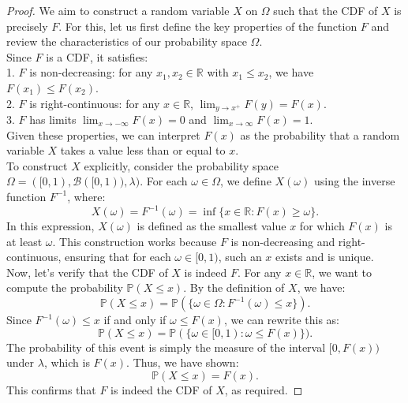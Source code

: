 \begin{proof}
We aim to construct a random variable \( X \) on \( \Omega \) such that the CDF of \( X \) is precisely \( F \). For this, let us first define the key properties of the function \( F \) and review the characteristics of our probability space \( \Omega \).\\

Since \( F \) is a CDF, it satisfies:\\

1. \( F \) is non-decreasing: for any \( x_1, x_2 \in \mathbb{R} \) with \( x_1 \leq x_2 \), we have \( F(x_1) \leq F(x_2) \).\\
2. \( F \) is right-continuous: for any \( x \in \mathbb{R} \), \( \lim_{y \to x^+} F(y) = F(x) \).\\
3. \( F \) has limits \( \lim_{x \to -\infty} F(x) = 0 \) and \( \lim_{x \to \infty} F(x) = 1 \).\\

Given these properties, we can interpret \( F(x) \) as the probability that a random variable \( X \) takes a value less than or equal to \( x \).\\

To construct \( X \) explicitly, consider the probability space \( \Omega = ([0, 1), \mathcal{B}([0, 1)), \lambda) \). For each \( \omega \in \Omega \), we define \( X(\omega) \) using the inverse function \( F^{-1} \), where:
\[
X(\omega) = F^{-1}(\omega) = \inf \{ x \in \mathbb{R} : F(x) \geq \omega \}.
\]
In this expression, \( X(\omega) \) is defined as the smallest value \( x \) for which \( F(x) \) is at least \( \omega \). This construction works because \( F \) is non-decreasing and right-continuous, ensuring that for each \( \omega \in [0, 1) \), such an \( x \) exists and is unique.\\

Now, let’s verify that the CDF of \( X \) is indeed \( F \). For any \( x \in \mathbb{R} \), we want to compute the probability \( \mathbb{P}(X \leq x) \). By the definition of \( X \), we have:
\[
\mathbb{P}(X \leq x) = \mathbb{P}(\{\omega \in \Omega : F^{-1}(\omega) \leq x \}).
\]
Since \( F^{-1}(\omega) \leq x \) if and only if \( \omega \leq F(x) \), we can rewrite this as:
\[
\mathbb{P}(X \leq x) = \mathbb{P}(\{\omega \in [0, 1) : \omega \leq F(x)\}).
\]
The probability of this event is simply the measure of the interval \( [0, F(x)) \) under \( \lambda \), which is \( F(x) \). Thus, we have shown:
\[
\mathbb{P}(X \leq x) = F(x).
\]
This confirms that \( F \) is indeed the CDF of \( X \), as required.
\end{proof}


